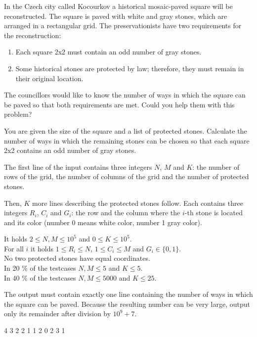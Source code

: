 





In the Czech city called Kocourkov a historical mosaic-paved square will be
reconstructed. The square is paved with white and gray stones, which are
arranged in a rectangular grid. The preservationists have two requirements for
the reconstruction:

\begin{enumerate}[nolistsep]
\item Each square 2x2 must contain an odd number of gray stones.
\item Some historical stones are protected by law; therefore, they must remain
  in their original location.
\end{enumerate}

The councillors would like to know the number of ways in which the square can be
paved so that both requirements are met. Could you help them with this problem?


You are given the size of the square and a list of protected stones. Calculate
the number of ways in which the remaining stones can be chosen so that each
square 2x2 contains an odd number of gray stones.


The first line of the input contains three integers $N$, $M$ and $K$: the number
of rows of the grid, the number of columns of the grid and the number of
protected stones.

Then, $K$ more lines describing the protected stones follow. Each contains three
integers $R_i$, $C_i$ and $G_i$: the row and the column where the $i$-th stone
is located and its color (number 0 means white color, number 1 gray color).

\bigskip
\noindent
It holds $2 \leq N,M \leq 10^5$ and $0 \leq K \leq 10^5$.\\
For all $i$ it holds $1 \leq R_i \leq N$, $1 \leq C_i \leq M$ and
  $G_i \in \{ 0, 1 \}$.\\
No two protected stones have equal coordinates.\\
In 20 \% of the testcases $N,M \leq 5$ and $K \leq 5$.\\
In 40 \% of the testcases $N,M \leq 5000$ and $K \leq 25$.


The output must contain exactly one line containing the number of ways in which
the square can be paved. Because the resulting number can be very large, output
only its remainder after division by $10^9 + 7$.


 4 3
2 2 1
1 2 0
2 3 1
\sampleEND


